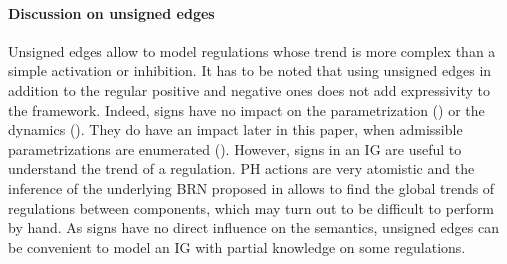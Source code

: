 \paragraph{Discussion on unsigned edges}
Unsigned edges allow to model regulations whose trend is more complex than a simple activation or inhibition.
It has to be noted that using unsigned edges in addition to the regular positive and negative ones does not add expressivity to the framework.
Indeed, signs have no impact on the parametrization () or the dynamics ().
They do have an impact later in this paper, when admissible parametrizations are enumerated ().
However, signs in an IG are useful to understand the trend of a regulation.
PH actions are very atomistic and the inference of the underlying BRN proposed in 
allows to find the global trends of regulations between components,
which may turn out to be difficult to perform by hand.
As signs have no direct influence on the semantics, unsigned edges can be convenient to model an IG with partial knowledge on some regulations.

